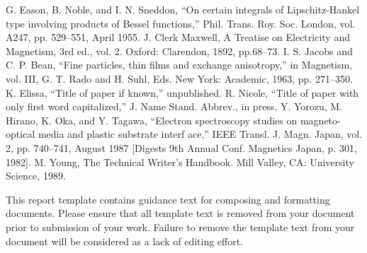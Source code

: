 \documentclass[conference]{IEEEtran}
\begin{document}
\begin{thebibliography}{plain}
 G. Eason, B. Noble, and I. N. Sneddon, ``On certain integrals of Lipschitz-Hankel type involving products of Bessel functions,'' Phil. Trans. Roy. Soc. London, vol. A247, pp. 529--551, April 1955.
 J. Clerk Maxwell, A Treatise on Electricity and Magnetism, 3rd ed., vol. 2. Oxford: Clarendon, 1892, pp.68--73.
 I. S. Jacobs and C. P. Bean, ``Fine particles, thin films and exchange anisotropy,'' in Magnetism, vol. III, G. T. Rado and H. Suhl, Eds. New York: Academic, 1963, pp. 271--350.
 K. Elissa, ``Title of paper if known,'' unpublished.
 R. Nicole, ``Title of paper with only first word capitalized,'' J. Name Stand. Abbrev., in press.
 Y. Yorozu, M. Hirano, K. Oka, and Y. Tagawa, ``Electron spectroscopy studies on magneto-optical media and plastic substrate interf	ace,'' IEEE Transl. J. Magn. Japan, vol. 2, pp. 740--741, August 1987 [Digests 9th Annual Conf. Magnetics Japan, p. 301, 1982].
 M. Young, The Technical Writer's Handbook. Mill Valley, CA: University Science, 1989.
\end{thebibliography}

\vspace{12pt}
\color{red}
This report template contains guidance text for composing and formatting documents. Please ensure that all template text is removed from your document prior to submission of your work. Failure to remove the template text from your document will be considered as a lack of editing effort.
\end{document}
